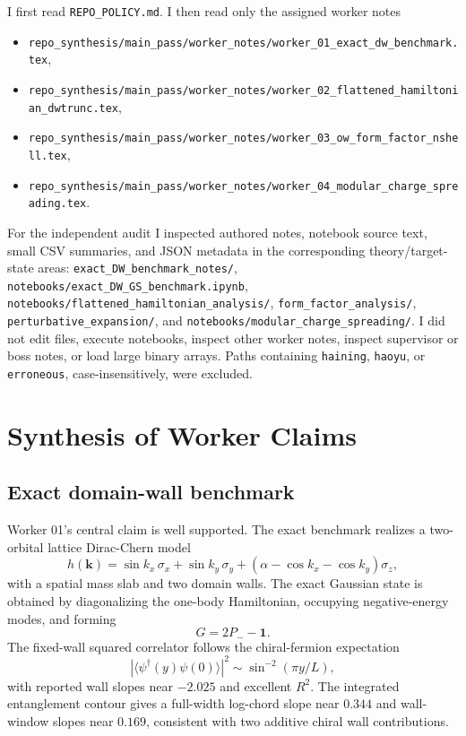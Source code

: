 \documentclass[aps,prb,onecolumn,nofootinbib,superscriptaddress]{revtex4-2}
\newcommand{\Id}{\mathbf{1}}
\begin{document}
I first read \texttt{REPO\_POLICY.md}.  I then read only the assigned worker notes
\begin{itemize}
\item \texttt{repo\_synthesis/main\_pass/worker\_notes/worker\_01\_exact\_dw\_benchmark.tex},
\item \texttt{repo\_synthesis/main\_pass/worker\_notes/worker\_02\_flattened\_hamiltonian\_dwtrunc.tex},
\item \texttt{repo\_synthesis/main\_pass/worker\_notes/worker\_03\_ow\_form\_factor\_nshell.tex},
\item \texttt{repo\_synthesis/main\_pass/worker\_notes/worker\_04\_modular\_charge\_spreading.tex}.
\end{itemize}
For the independent audit I inspected authored notes, notebook source text, small CSV summaries, and JSON metadata in the corresponding theory/target-state areas:
\texttt{exact\_DW\_benchmark\_notes/},
\texttt{notebooks/exact\_DW\_GS\_benchmark.ipynb},
\texttt{notebooks/flattened\_hamiltonian\_analysis/},
\texttt{form\_factor\_analysis/},
\texttt{perturbative\_expansion/}, and
\texttt{notebooks/modular\_charge\_spreading/}.
I did not edit files, execute notebooks, inspect other worker notes, inspect supervisor or boss notes, or load large binary arrays.  Paths containing \texttt{haining}, \texttt{haoyu}, or \texttt{erroneous}, case-insensitively, were excluded.

\section{Synthesis of Worker Claims}

\subsection{Exact domain-wall benchmark}

Worker 01's central claim is well supported.  The exact benchmark realizes a two-orbital lattice Dirac-Chern model
\begin{equation}
h(\bm{k})=\sin k_x\,\sigma_x+\sin k_y\,\sigma_y+
(\alpha-\cos k_x-\cos k_y)\sigma_z ,
\end{equation}
with a spatial mass slab and two domain walls.  The exact Gaussian state is obtained by diagonalizing the one-body Hamiltonian, occupying negative-energy modes, and forming
\begin{equation}
G=2P_- - \Id .
\end{equation}
The fixed-wall squared correlator follows the chiral-fermion expectation
\begin{equation}
|\langle \psi^\dagger(y)\psi(0)\rangle|^2\sim
\sin^{-2}(\pi y/L),
\end{equation}
with reported wall slopes near $-2.025$ and excellent $R^2$.  The integrated entanglement contour gives a full-width log-chord slope near $0.344$ and wall-window slopes near $0.169$, consistent with two additive chiral wall contributions.
\end{document}

